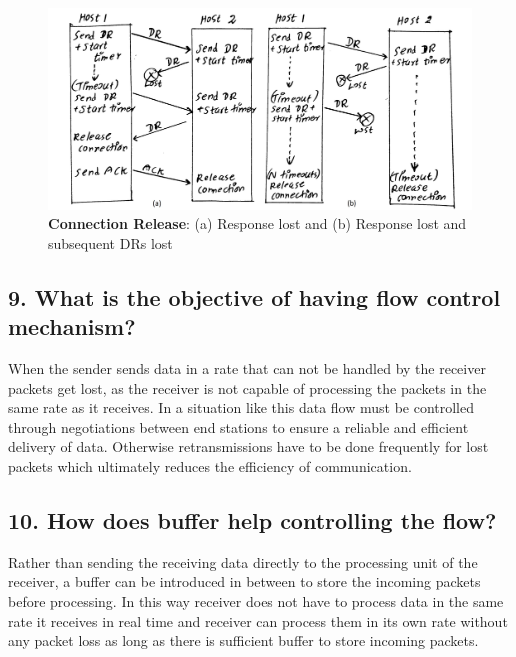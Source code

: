 \documentclass[a4paper,11pt]{article}
\begin{document}
\begin{figure}[H]
	\centering
	\includegraphics[scale=0.14]{figures/img102}
	\caption{\textbf{Connection Release}: (a) Response lost and (b) Response lost and subsequent DRs lost}
\end{figure}

\subsection*{9. What is the objective of having flow control mechanism?}

When the sender sends data in a rate that can not be handled by the receiver packets get lost, as the receiver is not capable of processing the packets in the same rate as it receives. In a situation like this data flow must be controlled through negotiations between end stations to ensure a reliable and efficient delivery of data. Otherwise retransmissions have to be done frequently for lost packets which ultimately reduces the efficiency of communication. 

\subsection*{10. How does buffer help controlling the flow?}

Rather than sending the receiving data directly to the processing unit of the receiver, a buffer can be introduced in between to store the incoming packets before processing. In this way receiver does not have to process data in the same rate it receives in real time and receiver can process them in its own rate without any packet loss as long as there is sufficient buffer to store incoming packets.
\end{document}
